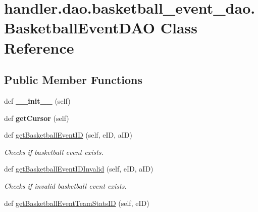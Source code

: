 \hypertarget{classhandler_1_1dao_1_1basketball__event__dao_1_1_basketball_event_d_a_o}{}\section{handler.\+dao.\+basketball\+\_\+event\+\_\+dao.\+Basketball\+Event\+D\+AO Class Reference}
\label{classhandler_1_1dao_1_1basketball__event__dao_1_1_basketball_event_d_a_o}
\subsection*{Public Member Functions}
\begin{DoxyCompactItemize}
\item 
\mbox{\label{classhandler_1_1dao_1_1basketball__event__dao_1_1_basketball_event_d_a_o_ace78a92edd3910bda7dc17a7f8541a81}} 
def {\bfseries \+\_\+\+\_\+init\+\_\+\+\_\+} (self)
\item 
\mbox{\label{classhandler_1_1dao_1_1basketball__event__dao_1_1_basketball_event_d_a_o_a851f99879770c7a53cb5bafafb63759b}} 
def {\bfseries get\+Cursor} (self)
\item 
def \hyperlink{classhandler_1_1dao_1_1basketball__event__dao_1_1_basketball_event_d_a_o_a755fa580876dc7ba2ee3621153a36da3}{get\+Basketball\+Event\+ID} (self, e\+ID, a\+ID)
\begin{DoxyCompactList}\small\item\em Checks if basketball event exists. \end{DoxyCompactList}\item 
def \hyperlink{classhandler_1_1dao_1_1basketball__event__dao_1_1_basketball_event_d_a_o_a7f99ad79343a2952df00c0ad3b3674be}{get\+Basketball\+Event\+I\+D\+Invalid} (self, e\+ID, a\+ID)
\begin{DoxyCompactList}\small\item\em Checks if invalid basketball event exists. \end{DoxyCompactList}\item 
def \hyperlink{classhandler_1_1dao_1_1basketball__event__dao_1_1_basketball_event_d_a_o_ae1c6d7feade360798e1439d870724af5}{get\+Basketball\+Event\+Team\+Stats\+ID} (self, e\+ID)

\end{DoxyCompactItemize}
